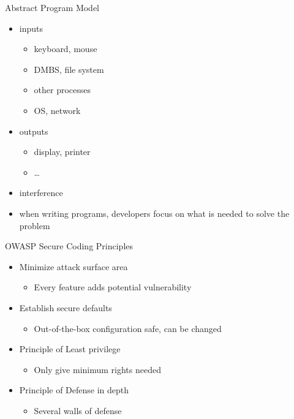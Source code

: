\documentclass{beamer}
\begin{document}
\begin{frame}{Abstract Program Model}
  \begin{itemize}
  \item inputs
    \begin{itemize}
    \item keyboard, mouse
    \item DMBS, file system
    \item other processes
    \item OS, network
    \end{itemize}
  \item outputs
    \begin{itemize}
    \item display, printer
    \item \dots
    \end{itemize}
  \item interference
  \item when writing programs, developers focus on what is needed to
    solve the problem
  \end{itemize}
\end{frame}
 
\begin{frame}{OWASP Secure Coding Principles}
  \begin{itemize}
    \item Minimize attack surface area
      \begin{itemize}
      \item Every feature adds potential vulnerability
      \end{itemize}
    \item Establish secure defaults
      \begin{itemize}
      \item Out-of-the-box configuration safe, can be changed
      \end{itemize}
    \item Principle of Least privilege
      \begin{itemize}
      \item Only give minimum rights needed
      \end{itemize}
    \item Principle of Defense in depth
      \begin{itemize}
      \item Several walls of defense 
      \end{itemize}
  \end{itemize}
\end{frame}
\end{document}
